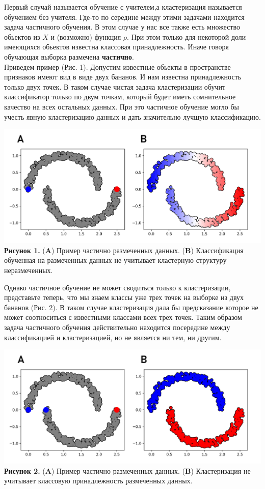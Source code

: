 Первый случай называется обучение с учителем,а кластеризация называется обучением без учителя. Где-то по середине между этими задачами находится задача частичного обучения. В этом случае у нас все также есть множество обьектов из $X$ и (возможно) функция $\rho$. При этом только для некоторой доли имеющихся обьектов известна классовая принадлежность. Иначе говоря обучающая выборка размечена \textbf{частично}. \\

Приведем пример (Рис. 1). Допустим известные обьекты в пространстве признаков имеют вид в виде двух бананов. И нам известна принадлежность только двух точек. В таком случае чистая задача кластеризации обучит классификатор только по двум точкам, который будет иметь сомнительное качество на всех остальных данных. При это частичное обучение могло бы учесть явную кластеризацию данных и дать значительно лучшую классификацию.\\

\begin{center}
\includegraphics[width=1.0\textwidth]{picture_1.png}
\textbf{Рисунок 1.} (\textbf{A}) Пример частично размеченных данных. (\textbf{B}) Классификация обученная на размеченных данных не учитывает кластерную структуру неразмеченных. 
\end{center}

Однако частичное обучение не может сводиться только к кластеризации, представьте теперь, что мы знаем классы уже трех точек на выборке из двух бананов (Рис. 2). В таком случае кластеризация дала бы предсказание которое не может соотноситься с известными классами всех трех точек. Таким образом задача частичного обучения действительно находится посередине между классификацией и кластеризацией, но не является ни тем, ни другим. \\
\begin{center}
\includegraphics[width=1.0\textwidth]{picture_2.png}
\textbf{Рисунок 2.} (\textbf{A}) Пример частично размеченных данных. (\textbf{B}) Кластеризация не учитывает классовую принадлежность размеченных данных. 
\end{center}

